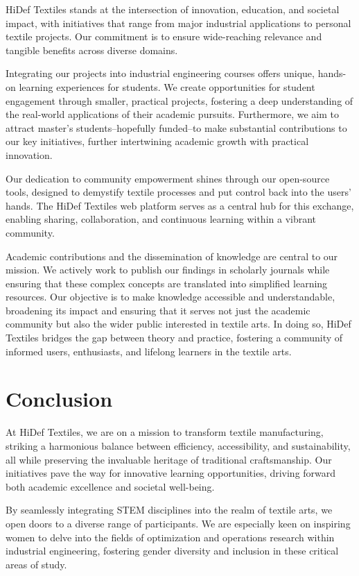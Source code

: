 \documentclass{article}
\begin{document}
    HiDef Textiles stands at the intersection of innovation, education, and societal impact, with initiatives that
    range from major industrial applications to personal textile projects. Our commitment is to ensure wide-reaching
    relevance and tangible benefits across diverse domains.

    Integrating our projects into industrial engineering courses offers unique, hands-on learning experiences for
    students. We create opportunities for student engagement through smaller, practical projects, fostering a deep
    understanding of the real-world applications of their academic pursuits. Furthermore, we aim to attract master's
    students--hopefully funded--to make substantial contributions to our key initiatives, further intertwining
    academic growth with practical innovation.

    Our dedication to community empowerment shines through our open-source tools, designed to demystify textile
    processes and put control back into the users' hands. The HiDef Textiles web platform serves as a central hub for
    this exchange, enabling sharing, collaboration, and continuous learning within a vibrant community.

    Academic contributions and the dissemination of knowledge are central to our mission. We actively work to publish
    our findings in scholarly journals while ensuring that these complex concepts are translated into simplified
    learning resources. Our objective is to make knowledge accessible and understandable, broadening its impact and
    ensuring that it serves not just the academic community but also the wider public interested in textile arts. In
    doing so, HiDef Textiles bridges the gap between theory and practice, fostering a community of informed users,
    enthusiasts, and lifelong learners in the textile arts.

    \section{Conclusion}

    At HiDef Textiles, we are on a mission to transform textile manufacturing, striking a harmonious balance between
    efficiency, accessibility, and sustainability, all while preserving the invaluable heritage of traditional
    craftsmanship. Our initiatives pave the way for innovative learning opportunities, driving forward both academic
    excellence and societal well-being.

    By seamlessly integrating STEM disciplines into the realm of textile arts, we open doors to a diverse range of
    participants. We are especially keen on inspiring women to delve into the fields of optimization and operations
    research within industrial engineering, fostering gender diversity and inclusion in these critical areas of study.
\end{document}
